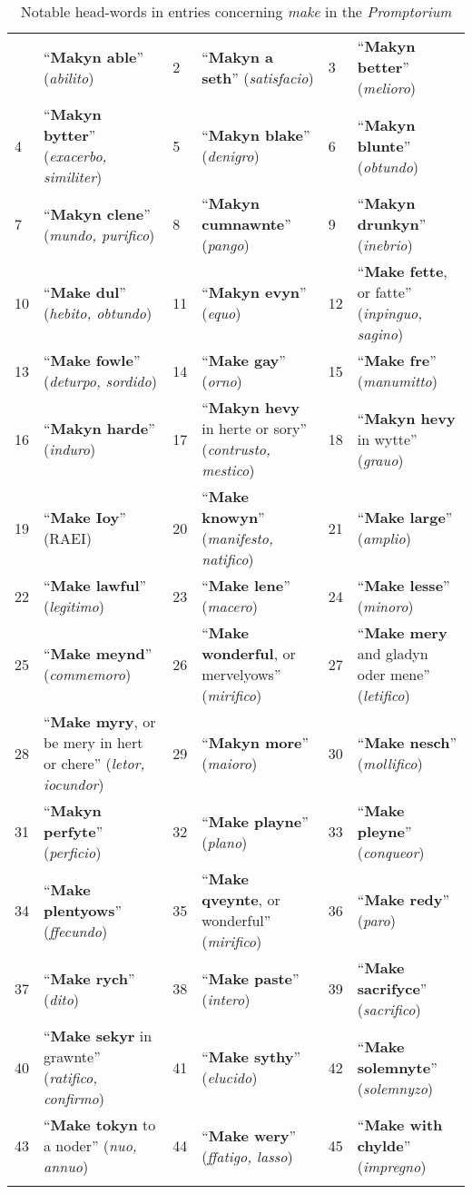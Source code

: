 \documentclass[output=paper,colorlinks,citecolor=brown,arabicfont,chinesefont]{langscibook}
\begin{document}
\begin{table}
\caption {Notable head-words in entries concerning \textit{make} in the \textit{Promptorium}}
\label{tab:miyoshi:table10}
\small
\begin{tabularx}{\linewidth}{lQlQlQ}
 & “\textbf{Makyn able}” (\emph{abilito}) & 2 & “\textbf{Makyn a seth}” (\emph{satisfacio}) & 3 & “\textbf{Makyn better}” (\emph{melioro}) \\
 4 & “\textbf{Makyn bytter}” (\emph{exacerbo, similiter}) & 5 & “\textbf{Makyn blake}” (\emph{denigro}) & 6 & “\textbf{Makyn blunte}” (\emph{obtundo}) \\
 7 & “\textbf{Makyn clene}” (\emph{mundo, purifico}) & 8 & “\textbf{Makyn cumnawnte}” (\emph{pango}) & 9 & “\textbf{Makyn drunkyn}” (\emph{inebrio}) \\
 10 & “\textbf{Make dul}” (\emph{hebito, obtundo}) & 11 & “\textbf{Makyn evyn}” (\emph{equo}) & 12 & “\textbf{Make fette}, or fatte” (\emph{inpinguo, sagino}) \\
 13 & “\textbf{Make fowle}” (\emph{deturpo, sordido}) & 14 & “\textbf{Make gay}” (\emph{orno}) & 15 & “\textbf{Make fre}” (\emph{manumitto}) \\
 16 & “\textbf{Makyn harde}” (\emph{induro}) & 17 & “\textbf{Makyn hevy} in herte or sory” (\emph{contrusto, mestico}) & 18 & “\textbf{Makyn hevy } in wytte” (\emph{grauo}) \\
 19 & “\textbf{Make Ioy}” (RAEI) & 20 & “\textbf{Make knowyn}” (\emph{manifesto, natifico}) & 21 & “\textbf{Make large}” (\emph{amplio}) \\
 22 & “\textbf{Make lawful}” (\emph{legitimo}) & 23 & “\textbf{Make lene}” (\emph{macero}) & 24 & “\textbf{Make lesse}” (\emph{minoro}) \\
 25 & “\textbf{Make meynd}” (\emph{commemoro}) & 26 & “\textbf{Make wonderful}, or mervelyows” (\emph{mirifico}) & 27 & “\textbf{Make mery} and gladyn oder mene” (\emph{letifico}) \\
 28 & “\textbf{Make myry}, or be mery in hert or chere” (\emph{letor, iocundor}) & 29 & “\textbf{Makyn more}” (\emph{maioro}) & 30 & “\textbf{Make nesch}” (\emph{mollifico}) \\
 31 & “\textbf{Makyn perfyte}” (\emph{perficio}) & 32 & “\textbf{Make playne}” (\emph{plano}) & 33 & “\textbf{Make pleyne}” (\emph{conqueor}) \\
 34 & “\textbf{Make plentyows}” (\emph{ffecundo}) & 35 & “\textbf{Make qveynte}, or wonderful” (\emph{mirifico}) & 36 & “\textbf{Make redy}” (\emph{paro}) \\
 37 & “\textbf{Make rych}” (\emph{dito}) & 38 & “\textbf{Make paste}” (\emph{intero}) & 39 & “\textbf{Make sacrifyce}” (\emph{sacrifico}) \\
 40 & “\textbf{Make sekyr} in grawnte” (\emph{ratifico, confirmo}) & 41 & “\textbf{Make sythy}” (\emph{elucido}) & 42 & “\textbf{Make solemnyte}” (\emph{solemnyzo}) \\
 43 & “\textbf{Make tokyn} to a noder” (\emph{nuo, annuo}) & 44 & “\textbf{Make wery}” (\emph{ffatigo, lasso}) & 45 & “\textbf{Make with chylde}” (\emph{impregno}) \\
 \lspbottomrule
\end{tabularx}
\end{table}
\end{document}
